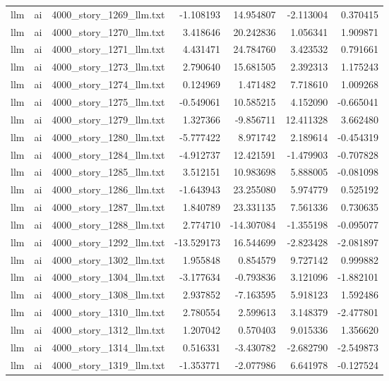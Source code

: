 \begin{longtable}{lllrrrr}
llm & ai & 4000\_story\_1269\_llm.txt & -1.108193 & 14.954807 & -2.113004 & 0.370415 \\
llm & ai & 4000\_story\_1270\_llm.txt & 3.418646 & 20.242836 & 1.056341 & 1.909871 \\
llm & ai & 4000\_story\_1271\_llm.txt & 4.431471 & 24.784760 & 3.423532 & 0.791661 \\
llm & ai & 4000\_story\_1273\_llm.txt & 2.790640 & 15.681505 & 2.392313 & 1.175243 \\
llm & ai & 4000\_story\_1274\_llm.txt & 0.124969 & 1.471482 & 7.718610 & 1.009268 \\
llm & ai & 4000\_story\_1275\_llm.txt & -0.549061 & 10.585215 & 4.152090 & -0.665041 \\
llm & ai & 4000\_story\_1279\_llm.txt & 1.327366 & -9.856711 & 12.411328 & 3.662480 \\
llm & ai & 4000\_story\_1280\_llm.txt & -5.777422 & 8.971742 & 2.189614 & -0.454319 \\
llm & ai & 4000\_story\_1284\_llm.txt & -4.912737 & 12.421591 & -1.479903 & -0.707828 \\
llm & ai & 4000\_story\_1285\_llm.txt & 3.512151 & 10.983698 & 5.888005 & -0.081098 \\
llm & ai & 4000\_story\_1286\_llm.txt & -1.643943 & 23.255080 & 5.974779 & 0.525192 \\
llm & ai & 4000\_story\_1287\_llm.txt & 1.840789 & 23.331135 & 7.561336 & 0.730635 \\
llm & ai & 4000\_story\_1288\_llm.txt & 2.774710 & -14.307084 & -1.355198 & -0.095077 \\
llm & ai & 4000\_story\_1292\_llm.txt & -13.529173 & 16.544699 & -2.823428 & -2.081897 \\
llm & ai & 4000\_story\_1302\_llm.txt & 1.955848 & 0.854579 & 9.727142 & 0.999882 \\
llm & ai & 4000\_story\_1304\_llm.txt & -3.177634 & -0.793836 & 3.121096 & -1.882101 \\
llm & ai & 4000\_story\_1308\_llm.txt & 2.937852 & -7.163595 & 5.918123 & 1.592486 \\
llm & ai & 4000\_story\_1310\_llm.txt & 2.780554 & 2.599613 & 3.148379 & -2.477801 \\
llm & ai & 4000\_story\_1312\_llm.txt & 1.207042 & 0.570403 & 9.015336 & 1.356620 \\
llm & ai & 4000\_story\_1314\_llm.txt & 0.516331 & -3.430782 & -2.682790 & -2.549873 \\
llm & ai & 4000\_story\_1319\_llm.txt & -1.353771 & -2.077986 & 6.641978 & -0.127524 \\

\end{longtable}

